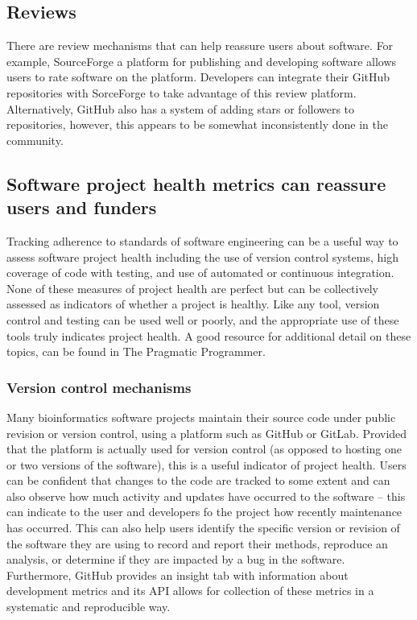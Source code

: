 \documentclass{article}
\begin{document}
\subsection{Reviews}
There are review mechanisms that can help reassure users about software. For example, SourceForge\cite{sourceforge} a platform for publishing and developing software allows users to rate software on the platform. Developers can integrate their GitHub repositories with SorceForge to take advantage of this review platform. Alternatively, GitHub also has a system of adding stars or followers to repositories, however, this appears to be somewhat inconsistently done in the community. 

\subsection{Software project health metrics can reassure users and funders}
Tracking adherence to standards of software engineering can be a useful way to assess software project health including the use of version control systems, high coverage of code with testing, and use of automated or continuous integration. None of these measures of project health are perfect but can be collectively assessed as indicators of whether a project is healthy. Like any tool, version control and testing can be used well or poorly, and the appropriate use of these tools truly indicates project health. A good resource for additional detail on these topics, can be found in The Pragmatic Programmer\cite{thomas_pragmatic_2019}. 

\subsubsection{Version control mechanisms}
Many bioinformatics software projects maintain their source code under public revision or version control, using a platform such as GitHub or GitLab. Provided that the platform is actually used for version control (as opposed to hosting one or two versions of the software), this is a useful indicator of project health. Users can be confident that changes to the code are tracked to some extent and can also observe how much activity and updates have occurred to the software -- this can indicate to the user and developers fo the project how recently maintenance has occurred. This can also help users identify the specific version or revision of the software they are using to record and report their methods, reproduce an analysis, or determine if they are impacted by a bug in the software. Furthermore, GitHub provides an insight tab with information about development metrics and its API allows for collection of these metrics in a systematic and reproducible way. 
\end{document}
